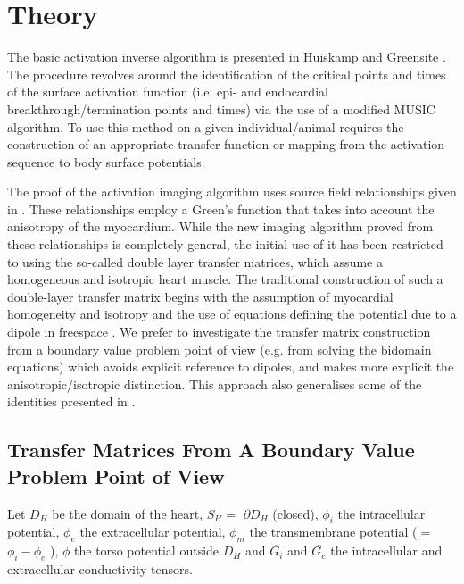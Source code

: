 
\section{Theory}
\enlargethispage{\baselineskip}
The basic activation inverse algorithm is presented in Huiskamp and 
Greensite \cite{huiskamp:1997}.
The procedure revolves around the identification of the critical
points and times of the surface activation function (i.e. epi- and
endocardial breakthrough/termination points and times) via the use of
a modified MUSIC algorithm.  To use this method on a given
individual/animal requires the construction of an appropriate transfer
function or mapping from the activation sequence to body surface
potentials.

The proof of the activation imaging algorithm \cite{greensite:1998b} uses
source field relationships given in \cite{yamashita:1985}.  These
relationships employ a Green's function that takes into account the anisotropy
of the myocardium.  While the new imaging algorithm proved from these
relationships is completely general, the initial use of it has been restricted
to using the so-called double layer transfer matrices, which assume a
homogeneous and
isotropic heart muscle.  The traditional construction of such a double-layer
transfer matrix begins with the assumption of myocardial homogeneity and
isotropy and the use of equations defining the potential due to a dipole in
freespace \cite{cuppen:1984}. We prefer to investigate the transfer matrix
construction from a boundary value problem point of view (e.g. from solving
the bidomain equations) which avoids explicit reference to dipoles, and makes
more explicit the anisotropic/isotropic distinction.  This approach also
generalises some of the identities presented in \cite{yamashita:1985}.

\subsection{Transfer Matrices From A Boundary Value Problem Point of View}
Let $D_{H}$ be the domain of the heart, $S_{H}=$ $\partial D_{H}$ (closed),
$\phi _{i}$ the intracellular potential,
$\phi _{e}$ the extracellular potential,
$\phi _{m}$ the transmembrane potential ($=$ $\phi _{i}-\phi _{e}$ ),
$\phi $ the torso potential outside $D_{H}$ and
$\overline{G_{i}}$ and $\overline{G_{e}}$ the intracellular and
extracellular conductivity tensors.

